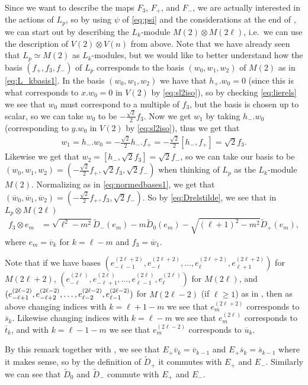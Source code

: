 Since we want to describe the maps $F_3$, $F_+$, and $F_-$, we are actually interested in the actions of $L_p$, so by using $\psi$ of \cref{eq:psi} and the considerations at the end of , we can start out by describing the $L_k$-module $M(2)\otimes M(2\ell)$, i.e.\ we can use the description of $V(2)\otimes V(n)$ from above. Note that we have already seen that $L_p\simeq M(2)$ as $L_k$-modules, but we would like to better understand how the basis $(f_+,f_3,f_-)$ of $L_p$ corresponds to the basis $(w_0,w_1,w_2)$ of $M(2)$ as in \cref{eq:L_kbasis1}. In the basis $(w_0,w_1,w_2)$ we have that $h_+ . w_0 = 0$ (since this is what corresponds to $x.w_0=0$ in $V(2)$ by \cref{eq:sl2iso}), so by checking \cref{eq:lierels} we see that $w_0$ must correspond to a multiple of $f_3$, but the basis is chosen up to scalar, so we can take $w_0$ to be $-\tfrac{\sqrt{2}}{2}f_3$. Now we get $w_1$ by taking $h_- . w_0$ (corresponding to $y.w_0$ in $V(2)$ by \cref{eq:sl2iso}), thus we get that
\begin{align*}
  w_1 = h_-.w_0 = -\tfrac{\sqrt{2}}{2}h_- . f_+ = -\tfrac{\sqrt{2}}{2}[h_-,f_+] = \sqrt{2}f_3.
\end{align*}
Likewise we get that $w_2=[h_-,\sqrt{2}f_3]=\sqrt{2}f_-$, so we can take our basis to be $(w_0,w_1,w_2)=(-\tfrac{\sqrt{2}}{2}f_+,\sqrt{2}f_3,\sqrt{2}f_-)$ when thinking of $L_p$ as the $L_k$-module $M(2)$. Normalizing as in \cref{eq:normedbases1}, we get that $(\overline w_0,\overline w_1,\overline w_2)=(-\tfrac{\sqrt{2}}{2}f_+,f_3,\sqrt{2}f_-)$. So by \cref{eq:Drelstilde}, we see that in $L_p\otimes M(2\ell)$
\begin{align*}
  f_3 \otimes e_m &= \sqrt{\ell^2-m^2}\widetilde D_-(e_m) - m\widetilde D_0(e_m) - \sqrt{(\ell+1)^2-m^2}\widetilde D_+(e_m),
\end{align*}
where $e_m=\overline v_k$ for $k=\ell-m$ and $f_3 = \overline w_1$.
\begin{remark}\label{rem:baseswithindexchange}
  Note that if we have bases $(e_{-\ell-1}^{(2\ell+2)},e_{-\ell}^{(2\ell+2)},\dotsc,e_{\ell}^{(2\ell+2)},e_{\ell+1}^{(2\ell+2)})$ for $M(2\ell+2)$, $(e_{-\ell}^{(2\ell)},e_{-\ell+1}^{(2\ell)},\dotsc,e_{\ell-1}^{(2\ell)},e_{\ell}^{(2\ell)})$ for $M(2\ell)$, and $(e_{-\ell+1}^{(2\ell-2)},e_{-\ell+2}^{(2\ell-2)},\dotsc,\\ e_{\ell-2}^{(2\ell-2)},e_{\ell-1}^{(2\ell-2)})$ for $M(2\ell-2)$ (if $\ell\geq 1$) as in , then as above changing indices with $k=\ell+1-m$ we see that $e_m^{(2\ell+2)}$ corresponds to $\overline s_k$. Likewise changing indices with $k=\ell-m$ we see that $e_m^{(2\ell)}$ corresponds to $\overline t_k$, and with $k=\ell-1-m$ we see that $e_m^{(2\ell-2)}$ corresponds to $\overline u_k$. 
\end{remark}
By this remark together with , we see that $E_+ \overline v_k = \overline v_{k-1}$ and $E_+ \overline s_k = \overline s_{k-1}$ where it makes sense, so by the definition of $\widetilde D_+$ it commutes with $E_+$ and $E_-$. Similarly we can see that $\widetilde D_0$ and $\widetilde D_-$ commute with $E_+$ and $E_-$.

